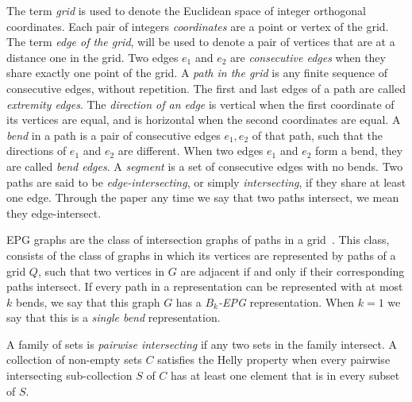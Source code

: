 \documentclass[runningheads]{llncs}
\begin{document}
The term \emph{grid} is used to denote the Euclidean space of integer orthogonal coordinates. Each pair of integers \emph{coordinates} are a point or vertex of the grid. The term \emph{edge of the grid}, will be used to denote a pair of vertices that are at a distance one in the grid. Two edges $e_1$ and $e_2$ are \emph{consecutive edges} when they share exactly one point of the grid. %
 A \emph{path in the grid} is any finite sequence of consecutive edges, without  repetition. The first and last edges of a path are called \emph{extremity edges}.
The \emph{direction of an edge} is vertical when the first coordinate of its vertices  are equal, and is horizontal when the second coordinates are equal. A \emph {bend} in a path is a pair of consecutive edges $ e_1, e_2 $ of that path, such that the directions of $ e_1$ and $ e_2$ are different. When two edges $ e_1$ and $e_2 $ form a bend, they are called \emph { bend edges}. A \emph {segment} is a set of consecutive edges with no bends. %
 Two paths are said to be \emph{edge-intersecting}, or  simply  \emph{intersecting}, if they share at least one edge. %
 Through the paper any time we say that two paths intersect, we mean they edge-intersect.  %

EPG graphs are the class of intersection graphs of paths in a grid~\cite{golumbic2009}. This class,  consists of the class of graphs in which its vertices are represented by paths of a grid $ Q $, such that two vertices in $ G $ are adjacent if and only if their corresponding paths intersect. If every path in a representation can be represented with at most $ k $ bends, we say that this graph $ G $ has a \emph{ $ B_k$-EPG} representation.%
When $ k = 1 $ we say that this is a \emph{single bend} representation.


A family of sets is \emph{pairwise intersecting} if any two sets in the family intersect. A collection of non-empty sets $C$ satisfies the Helly property when every pairwise intersecting sub-collection $S$ of $ C $ has at least one element that is in every subset of $S$.
\end{document}
